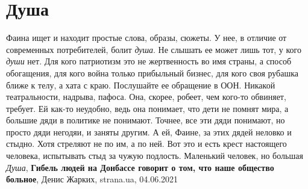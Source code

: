  
 
 
 
 
\chapter{Душа}
\label{sec:slova.dusha}

Фаина ищет и находит простые слова, образы, сюжеты. У нее, в отличие от
современных потребителей, болит \emph{душа}. Не слышать ее может лишь тот, у кого \emph{души}
нет. Для кого патриотизм это не жертвенность во имя страны, а способ
обогащения, для кого война только прибыльный бизнес, для кого своя рубашка
ближе к телу, а хата с краю.  Послушайте ее обращение в ООН. Никакой
театральности, надрыва, пафоса. Она, скорее, робеет, чем кого-то обвиняет,
требует. Ей как-то неудобно, ведь она понимает, что дети не помнят мира, а
большие дяди в политике не понимают. Точнее, все эти дяди понимают, но просто
дяди негодяи, и заняты другим. А ей, Фаине, за этих дядей неловко и стыдно.
Хотя стреляют не по им, а по ней. Вот это и есть крест настоящего человека,
испытывать стыд за чужую подлость. Маленький человек, но большая \emph{Душа},
\textbf{Гибель людей на Донбассе говорит о том, что наше общество больное},
Денис Жарких, strana.ua, 04.06.2021

